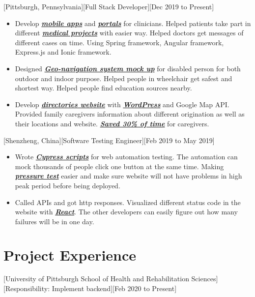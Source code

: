 \documentclass{article}
\begin{document}
[Pittsburgh, Pennsylvania][Full Stack Developer][Dec 2019 to Present]
\begin{itemize}
\item Develop \textbf{\textit{\underline{mobile apps}}} and \textbf{\textit{\underline{portals}}} for clinicians. Helped patients take part in different \textbf{\textit{\underline{medical projects}}} with easier way. Helped doctors get messages of different cases on time. Using Spring framework, Angular framework, Express.js and Ionic framework.

\item Designed \textbf{\textit{\underline{Geo-navigation system mock up}}} for disabled person for both outdoor and indoor purpose. Helped people in wheelchair get safest and shortest way. Helped people find education sources nearby.

\item Develop \textbf{\textit{\underline{directories website}}} with \textbf{\textit{\underline{WordPress}}} and  Google Map API. Provided family caregivers information about different origination as well as their locations and website. \textbf{\textit{\underline{Saved 30\% of time}}} for caregivers.
\end{itemize}

[Shenzheng, China][Software Testing Engineer][Feb 2019 to May 2019]
\begin{itemize}
\item Wrote  \textbf{\textit{\underline{Cypress scripts}}} for web automation testing. The automation can mock thousands of people click one button at the same time. Making \textbf{\textit{\underline{pressure test}}} easier and make sure website will not have problems in high peak period before being deployed.

\item Called APIs and got http responses. Visualized different status code in the website with \textbf{\textit{\underline{React}}}. The other developers can easily figure out how many failures will be in one day.
\end{itemize}


 
\section{Project Experience}

[University of Pittsburgh School of Health and Rehabilitation Sciences]
[Responsibility: Implement backend][Feb 2020 to Present]
\end{document}
